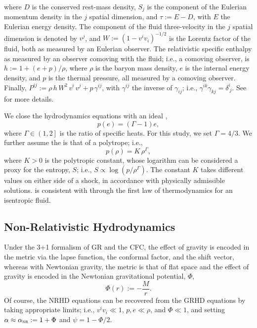 where $D$ is the conserved rest-mass density,
$S_{j}$ is the component
of the Eulerian momentum density in the $j$\th{} spatial dimension,
and $\tau:=E-D$, with $E$ the Eulerian energy density.
The component of the fluid three-velocity in the $j$\th{} spatial dimension
is denoted by $v^{j}$, and
$W:=\left(1-v^{i}v_{i}\right)^{-1/2}$ is the Lorentz factor
of the fluid, both as measured by an Eulerian observer.
The relativistic specific enthalpy as measured by an observer
comoving with the fluid; i.e., a comoving observer, is
$h:=1+\left(e+p\right)/\rho$, where
$\rho$ is the baryon mass density, $e$ is the internal energy density,
and $p$ is the thermal pressure, all measured by a comoving observer.
Finally, $P^{ij}:=\rho\,h\,W^{2}\,v^{i}\,v^{j}+p\,\gamma^{ij}$,
with $\gamma^{ij}$ the inverse of $\gamma_{ij}$; i.e.,
$\gamma^{ik}\gamma_{kj}=\delta^{i}_{~j}$.
See \citet{rz2013} for more details.

We close the hydrodynamics equations
with an ideal \eos,
\begin{equation}
  p\left(e\right)=\left(\Gamma-1\right)e,
  \label{eq.AP.idealEOS}
\end{equation}
where $\Gamma\in\left(1,2\right]$ is the ratio of specific heats.
For this study, we set $\Gamma=4/3$.
We further assume the \eos{} is that of a polytrope; i.e.,
\begin{equation}
  p\left(\rho\right)=K\,\rho^{\Gamma},
  \label{eq.AP.polytrope}
\end{equation}
where $K>0$ is the polytropic constant,
whose logarithm can be considered a proxy for the entropy, $S$;
i.e., $S\propto\log\left(p/\rho^{\Gamma}\right)$.
The constant $K$ takes different values on either side of a
shock, in accordance with physically admissible solutions.
 is consistent with 
through the first law of thermodynamics for an isentropic fluid.

\subsection{Non-Relativistic Hydrodynamics}

Under the 3+1 formalism of GR and the CFC,
the effect of gravity is encoded in the metric via the lapse function,
the conformal factor, and the shift vector, whereas with
Newtonian gravity,
the metric is that of flat space and the effect of gravity
is encoded in the Newtonian gravitational potential, $\Phi$,
\begin{equation}
  \Phi\left(r\right):=-\frac{M}{r}.
\end{equation}
Of course, the NRHD equations can be recovered from the GRHD equations
by taking appropriate limits; i.e.,
$v^{i}v_{i}\ll1$, $p,e\ll\rho$,
and $\Phi\ll1$, and setting $\alpha\approx\alpha_{\textsc{nr}}:=1+\Phi$
and $\psi=1-\Phi/2$.

